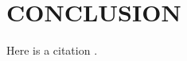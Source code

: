 \documentclass{article}
\begin{document}

\section{CONCLUSION}
\label{sec:CONC}

Here is a citation \cite{C2}. 





\end{document}
